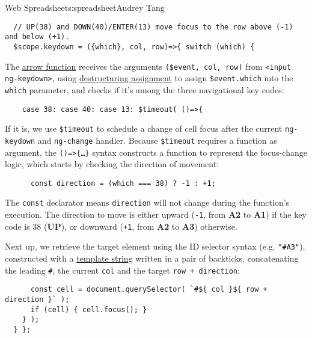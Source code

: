 \begin{aosachapter}{Web Spreadsheet}{s:spreadsheet}{Audrey Tang}
\begin{verbatim}
  // UP(38) and DOWN(40)/ENTER(13) move focus to the row above (-1) and below (+1).
  $scope.keydown = ({which}, col, row)=>{ switch (which) {
\end{verbatim}

The
\href{https://developer.mozilla.org/en-US/docs/Web/JavaScript/Reference/arrow_functions}{arrow
function} receives the arguments \texttt{(\$event, col, row)} from
\texttt{\textless{}input ng-keydown\textgreater{}}, using
\href{https://developer.mozilla.org/en-US/docs/Web/JavaScript/New_in_JavaScript/1.7\#Pulling_fields_from_objects_passed_as_function_parameter}{destructuring
assignment} to assign \texttt{\$event.which} into the \texttt{which}
parameter, and checks if it's among the three navigational key codes:

\begin{verbatim}
    case 38: case 40: case 13: $timeout( ()=>{
\end{verbatim}

If it is, we use \texttt{\$timeout} to schedule a change of cell focus
after the current \texttt{ng-keydown} and \texttt{ng-change} handler.
Because \texttt{\$timeout} requires a function as argument, the
\texttt{()=\textgreater{}\{\ldots{}\}} syntax constructs a function to
represent the focus-change logic, which starts by checking the direction
of movement:

\begin{verbatim}
      const direction = (which === 38) ? -1 : +1;
\end{verbatim}

The \texttt{const} declarator means \texttt{direction} will not change
during the function's execution. The direction to move is either upward
(\texttt{-1}, from \textbf{A2} to \textbf{A1}) if the key code is 38
(\textbf{UP}), or downward (\texttt{+1}, from \textbf{A2} to
\textbf{A3}) otherwise.

Next up, we retrieve the target element using the ID selector syntax
(e.g. \texttt{"\#A3"}), constructed with a
\href{https://developer.mozilla.org/en-US/docs/Web/JavaScript/Reference/template_strings}{template
string} written in a pair of backticks, concatenating the leading
\texttt{\#}, the current \texttt{col} and the target
\texttt{row + direction}:

\begin{verbatim}
      const cell = document.querySelector( `#${ col }${ row + direction }` );
      if (cell) { cell.focus(); }
    } );
  } };
\end{verbatim}


\end{aosachapter}
